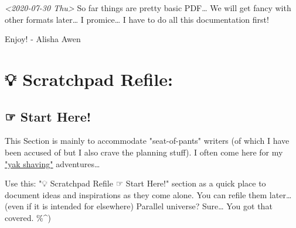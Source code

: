 \documentclass[11pt]{article}
\begin{document}
\textit{<2020-07-30 Thu> } So far things are pretty basic PDF\ldots{} We will get fancy with other formats later\ldots{} I promice\ldots{} I have to do all this documentation first!

Enjoy! - Alisha Awen

\section{💡 Scratchpad Refile:}
\label{sec:org62d4ac2}
\subsection{☞ Start Here!}
\label{sec:org775416c}

This Section is mainly to accommodate "seat-of-pants" writers (of which I have been accused of but I also crave the planning stuff).  I often come here for my \href{https://projects.csail.mit.edu/gsb/old-archive/gsb-archive/gsb2000-02-11.html}{"yak shaving"} adventures\ldots{}

Use this: "💡 Scratchpad Refile ☞ Start Here!" section as a quick place to document ideas and inspirations as they come alone.  You can refile them later\ldots{} (even if it is intended for elsewhere) Parallel universe? Sure\ldots{} You got that covered. \%\^{})
\end{document}
